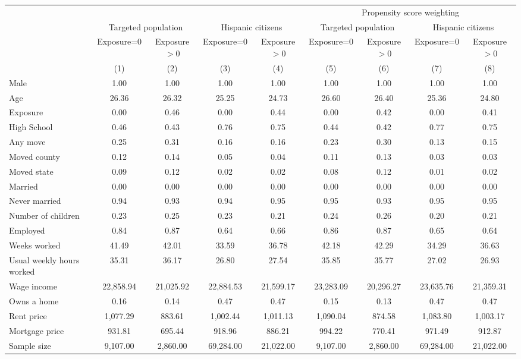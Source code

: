 \begin{tabular}{lcccccccc}
\toprule
\toprule
 & & & & & \multicolumn{4}{c}{Propensity score weighting} \\
 & \multicolumn{2}{c}{Targeted population} & \multicolumn{2}{c}{Hispanic citizens} & \multicolumn{2}{c}{Targeted population} & \multicolumn{2}{c}{Hispanic citizens}  \\
 & Exposure=0 & Exposure$>$0 & Exposure=0 & Exposure$>$0 & Exposure=0 & Exposure$>$0 & Exposure=0 & Exposure$>$0 \\
 & (1) & (2) & (3) & (4) & (5) & (6) & (7) & (8) \\
\midrule 
 Male  & 1.00 & 1.00 & 1.00 & 1.00 & 1.00 & 1.00 & 1.00 & 1.00\\
 Age  & 26.36 & 26.32 & 25.25 & 24.73 & 26.60 & 26.40 & 25.36 & 24.80\\
 Exposure  & 0.00 & 0.46 & 0.00 & 0.44 & 0.00 & 0.42 & 0.00 & 0.41\\
 High School  & 0.46 & 0.43 & 0.76 & 0.75 & 0.44 & 0.42 & 0.77 & 0.75\\
 Any move  & 0.25 & 0.31 & 0.16 & 0.16 & 0.23 & 0.30 & 0.13 & 0.15\\
 Moved county  & 0.12 & 0.14 & 0.05 & 0.04 & 0.11 & 0.13 & 0.03 & 0.03\\
 Moved state  & 0.09 & 0.12 & 0.02 & 0.02 & 0.08 & 0.12 & 0.01 & 0.02\\
 Married  & 0.00 & 0.00 & 0.00 & 0.00 & 0.00 & 0.00 & 0.00 & 0.00\\
 Never married  & 0.94 & 0.93 & 0.94 & 0.95 & 0.95 & 0.93 & 0.95 & 0.95\\
 Number of children  & 0.23 & 0.25 & 0.23 & 0.21 & 0.24 & 0.26 & 0.20 & 0.21\\
 Employed  & 0.84 & 0.87 & 0.64 & 0.66 & 0.86 & 0.87 & 0.65 & 0.64\\
 Weeks worked  & 41.49 & 42.01 & 33.59 & 36.78 & 42.18 & 42.29 & 34.29 & 36.63\\
 Usual weekly hours worked  & 35.31 & 36.17 & 26.80 & 27.54 & 35.85 & 35.77 & 27.02 & 26.93\\
 Wage income  & 22,858.94 & 21,025.92 & 22,884.53 & 21,599.17 & 23,283.09 & 20,296.27 & 23,635.76 & 21,359.31\\
 Owns a home  & 0.16 & 0.14 & 0.47 & 0.47 & 0.15 & 0.13 & 0.47 & 0.47\\
 Rent price  & 1,077.29 & 883.61 & 1,002.44 & 1,011.13 & 1,090.04 & 874.58 & 1,083.80 & 1,003.17\\
 Mortgage price  & 931.81 & 695.44 & 918.96 & 886.21 & 994.22 & 770.41 & 971.49 & 912.87\\
 Sample size  & 9,107.00 & 2,860.00 & 69,284.00 & 21,022.00 & 9,107.00 & 2,860.00 & 69,284.00 & 21,022.00\\
\bottomrule
\bottomrule
\end{tabular}